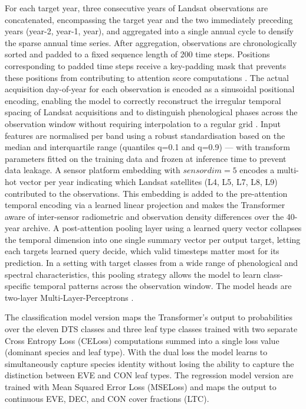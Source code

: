 \documentclass[essd, manuscript]{copernicus}
\begin{document}
For each target year, three consecutive years of Landsat observations are concatenated, encompassing the target year and the two immediately preceding years (year-2, year-1, year), and aggregated into a single annual cycle to densify the sparse annual time series. After aggregation, observations are chronologically sorted and padded to a fixed sequence length of 200 time steps. Positions corresponding to padded time steps receive a key-padding mask that prevents these positions from contributing to attention score computations \citep{vaswani_attention_2023}. The actual acquisition day-of-year for each observation is encoded as a sinusoidal positional encoding, enabling the model to correctly reconstruct the irregular temporal spacing of Landsat acquisitions and to distinguish phenological phases across the observation window without requiring interpolation to a regular grid \citep{yuan_yuan_self-supervised_2020}. Input features are normalised per band using a robust standardisation based on the median and interquartile range (quantiles q=0.1 and q=0.9) — with transform parameters fitted on the training data and frozen at inference time to prevent data leakage. A sensor platform embedding with $sensordim=5$ encodes a multi-hot vector per year indicating which Landsat satellites (L4, L5, L7, L8, L9) contributed to the observations. This embedding is added to the pre-attention temporal encoding via a learned linear projection and makes the Transformer aware of inter-sensor radiometric and observation density differences over the 40-year archive. A post-attention pooling layer using a learned query vector collapses the temporal dimension into one single summary vector per output target, letting each targets learned query decide, which valid timesteps matter most for its prediction. In a setting with target classes from a wide range of phenological and spectral characteristics, this pooling strategy allows the model to learn class-specific temporal patterns across the observation window. The model heads are two-layer Multi-Layer-Perceptrons \citep{hendrycks_gaussian_2016}.

The classification model version maps the Transformer's output to probabilities over the eleven DTS classes and three leaf type classes trained with two separate Cross Entropy Loss (CELoss) computations summed into a single loss value (dominant species and leaf type). With the dual loss the model learns to simultaneously capture species identity without losing the ability to capture the distinction between EVE and CON leaf types. The regression model version are trained with Mean Squared Error Loss (MSELoss) and maps the output to continuous EVE, DEC, and CON cover fractions (LTC). 
\end{document}
